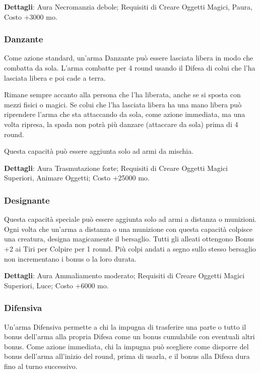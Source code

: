 \begin{multicols}{2}
\textbf{Dettagli}: Aura Necromanzia debole; Requisiti di Creare Oggetti Magici, Paura, Costo +3000 mo.

\subsubsection*{Danzante}

Come azione standard, un'arma Danzante può essere lasciata libera in modo che combatta da sola. L'arma combatte per 4 round usando il Difesa di colui che l'ha lasciata libera e poi cade a terra.

Rimane sempre accanto alla persona che l'ha liberata, anche se si sposta con mezzi fisici o magici. Se colui che l'ha lasciata libera ha una mano libera può riprendere l'arma che sta attaccando da sola, come azione immediata, ma una volta ripresa, la spada non potrà più danzare (attaccare da sola) prima di 4 round.

Questa capacità può essere aggiunta solo ad armi da mischia.

\textbf{Dettagli}: Aura Trasmutazione forte; Requisiti di Creare Oggetti Magici Superiori, Animare Oggetti; Costo +25000 mo.

\subsubsection*{Designante}

Questa capacità speciale può essere aggiunta solo ad armi a distanza o munizioni. Ogni volta che un'arma a distanza o una munizione con questa capacità colpisce una creatura, designa magicamente il bersaglio. Tutti gli alleati ottengono Bonus +2 ai Tiri per Colpire per 1 round. Più colpi andati a segno sullo stesso bersaglio non incrementano i bonus o la loro durata.

\textbf{Dettagli}: Aura Ammaliamento moderato; Requisiti di Creare Oggetti Magici Superiori, Luce; Costo +6000 mo.

\subsubsection*{Difensiva}

Un'arma Difensiva permette a chi la impugna di trasferire una parte o tutto il bonus dell'arma alla propria Difesa come un bonus cumulabile con eventuali altri bonus. Come azione immediata, chi la impugna può scegliere come disporre del bonus dell'arma all'inizio del round, prima di usarla, e il bonus alla Difesa dura fino al turno successivo.


\end{multicols}
